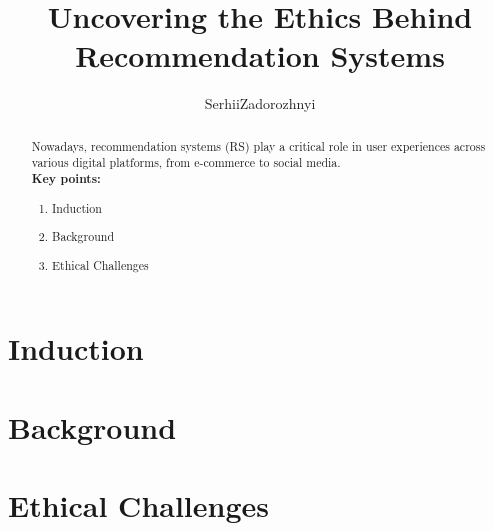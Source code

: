 \documentclass{article}
\title{Uncovering the Ethics Behind Recommendation Systems}
\author{Serhii\;Zadorozhnyi}
\begin{document}
\maketitle

\begin{abstract}
Nowadays, recommendation systems (RS) play a critical role in user experiences across various digital platforms, from e-commerce to social media.
\\\textbf{Key points:}
\begin{enumerate}
\item Induction
\item Background
\item Ethical Challenges
\end{enumerate}
\end{abstract}

\section{Induction}
\section{Background}
\section{Ethical Challenges}




\end{document}
